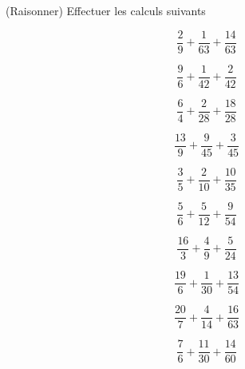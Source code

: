  (Raisonner) Effectuer les calculs suivants

\begin{multicols}{5}
$$\dfrac{2}{9}+\dfrac{1}{63}+\dfrac{14}{63}$$

$$\dfrac{9}{6}+\dfrac{1}{42}+\dfrac{2}{42}$$

$$\dfrac{6}{4}+\dfrac{2}{28}+\dfrac{18}{28}$$

$$\dfrac{13}{9}+\dfrac{9}{45}+\dfrac{3}{45}$$

$$\dfrac{3}{5}+\dfrac{2}{10}+\dfrac{10}{35}$$

$$\dfrac{5}{6}+\dfrac{5}{12}+\dfrac{9}{54}$$

$$\dfrac{16}{3}+\dfrac{4}{9}+\dfrac{5}{24}$$

$$\dfrac{19}{6}+\dfrac{1}{30}+\dfrac{13}{54}$$

$$\dfrac{20}{7}+\dfrac{4}{14}+\dfrac{16}{63}$$

$$\dfrac{7}{6}+\dfrac{11}{30}+\dfrac{14}{60}$$

\end{multicols}